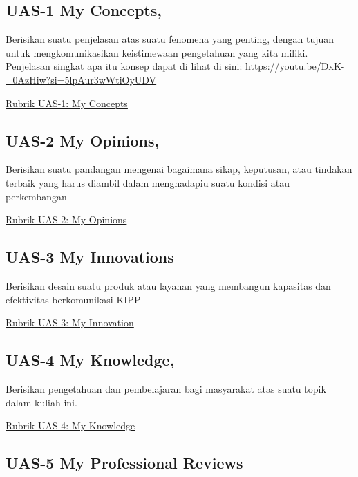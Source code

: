 \documentclass[
  letterpaper,
  DIV=11,
  numbers=noendperiod]{scrreprt}
\begin{document}
\subsection*{UAS-1 My Concepts,}\label{uas-1-my-concepts}

Berisikan suatu penjelasan atas suatu fenomena yang penting, dengan
tujuan untuk mengkomunikasikan keistimewaan pengetahuan yang kita
miliki. Penjelasan singkat apa itu konsep dapat di lihat di sini:
\url{https://youtu.be/DxK-_0AzHiw?si=5lpAur3wWtiOyUDV}

\href{./asesmen/Rubrik_II-2100_CSV/rubric_UAS1_MyConcepts.csv}{Rubrik
UAS-1: My Concepts}

\subsection*{UAS-2 My Opinions,}\label{uas-2-my-opinions}

Berisikan suatu pandangan mengenai bagaimana sikap, keputusan, atau
tindakan terbaik yang harus diambil dalam menghadapiu suatu kondisi atau
perkembangan

\href{./asesmen/Rubrik_II-2100_CSV/rubric_UAS2_MyOpinions.csv}{Rubrik
UAS-2: My Opinions}

\subsection*{UAS-3 My Innovations}\label{uas-3-my-innovations}

Berisikan desain suatu produk atau layanan yang membangun kapasitas dan
efektivitas berkomunikasi KIPP

\href{./asesmen/Rubrik_II-2100_CSV/rubric_UAS3_MyInnovations.csv}{Rubrik
UAS-3: My Innovation}

\subsection*{UAS-4 My Knowledge,}\label{uas-4-my-knowledge}

Berisikan pengetahuan dan pembelajaran bagi masyarakat atas suatu topik
dalam kuliah ini.

\href{./asesmen/Rubrik_II-2100_CSV/rubric_UAS4_MyKnowledge.csv}{Rubrik
UAS-4: My Knowledge}

\subsection*{UAS-5 My Professional
Reviews}\label{uas-5-my-professional-reviews}
\end{document}
